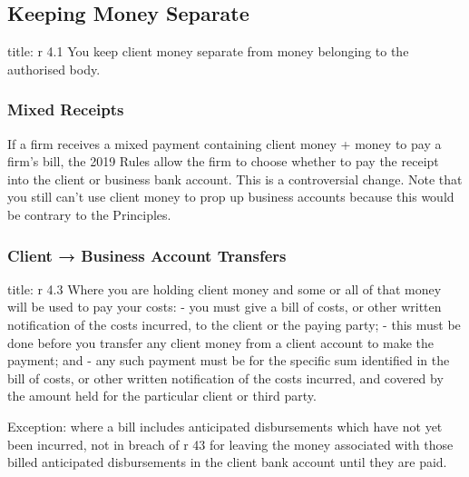 \documentclass[
]{article}
\newenvironment{Shaded}{}{}
\newcommand{\NormalTok}[1]{#1}
\begin{document}
\hypertarget{keeping-money-separate}{%
\subsection{Keeping Money Separate}\label{keeping-money-separate}}

\begin{Shaded}
\begin{Highlighting}[]
\NormalTok{title: r 4.1}
\NormalTok{You keep client money separate from money belonging to the authorised body.}
\end{Highlighting}
\end{Shaded}

\hypertarget{mixed-receipts}{%
\subsubsection{Mixed Receipts}\label{mixed-receipts}}

If a firm receives a mixed payment containing client money + money to
pay a firm's bill, the 2019 Rules allow the firm to choose whether to
pay the receipt into the client or business bank account. This is a
controversial change. Note that you still can't use client money to prop
up business accounts because this would be contrary to the Principles.

\hypertarget{client-business-account-transfers}{%
\subsubsection{Client → Business Account
Transfers}\label{client-business-account-transfers}}

\begin{Shaded}
\begin{Highlighting}[]
\NormalTok{title: r 4.3}
\NormalTok{Where you are holding client money and some or all of that money will be used to pay your costs:}
\NormalTok{{-} you must give a bill of costs, or other written notification of the costs incurred, to the client or the paying party;}
\NormalTok{{-} this must be done before you transfer any client money from a client account to make the payment; and}
\NormalTok{{-} any such payment must be for the specific sum identified in the bill of costs, or other written notification of the costs incurred, and covered by the amount held for the particular client or third party.}
\end{Highlighting}
\end{Shaded}

Exception: where a bill includes anticipated disbursements which have
not yet been incurred, not in breach of r 43 for leaving the money
associated with those billed anticipated disbursements in the client
bank account until they are paid.
\end{document}
